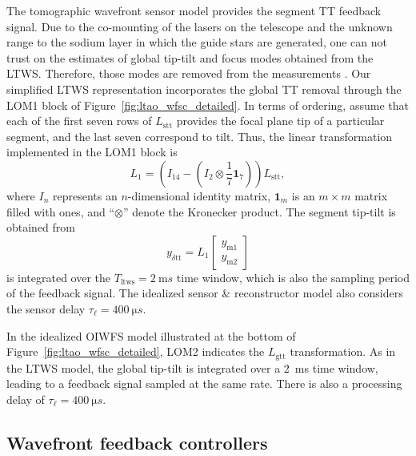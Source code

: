 \documentclass{gmto}
\begin{document}
The tomographic wavefront sensor model provides the segment TT feedback signal. Due to the co-mounting of the lasers on the telescope and the unknown range to the sodium layer in which the guide stars are generated, one can not trust on the estimates of global tip-tilt and focus modes obtained from the LTWS. Therefore, those modes are removed from the measurements \cite{GMT.DOC.05023, FWN.124}. %
Our simplified LTWS representation incorporates the global TT removal through the \textsc{LOM1} block of Figure~\ref{fig:ltao_wfsc_detailed}. In terms of ordering, assume that each of the first seven rows of $L_\text{stt}$ provides the focal plane tip of a particular segment, and the last seven correspond to tilt. Thus, the linear transformation implemented in the \textsc{LOM1} block is
\begin{equation*}
    L_1 = \left(I_{14} - \left(I_2 \otimes \frac{1}{7} \mathbf{1}_{7} \right)\right) L_\text{stt} ,
\end{equation*}
where $I_n$ represents an $n$-dimensional identity matrix, $\mathbf{1}_{m}$ is an $m \times m$ matrix filled with ones, and ``$\otimes$'' denote the Kronecker product. %
%
The segment tip-tilt is obtained from 
\[
y_{\delta\text{tt}} = L_1 \begin{bmatrix}
    y_\text{m1} \\ y_\text{m2}
\end{bmatrix}
\]
is integrated over the $T_\text{ltws}=\SI{2}{\milli s}$ time window, which is also the sampling period of the feedback signal. The idealized sensor \& reconstructor model also considers the sensor delay $\tau_\ell=\SI{400}{\micro s}$.


In the idealized OIWFS model illustrated at the bottom of Figure~\ref{fig:ltao_wfsc_detailed}, \textsc{LOM2} indicates the $L_\text{gtt}$ transformation. As in the LTWS model, the global tip-tilt is integrated over a \SI{2}{\milli s} time window, leading to a feedback signal sampled at the same rate. There is also a processing delay of $\tau_\ell=\SI{400}{\micro s}$.


\subsection{Wavefront feedback controllers}
\end{document}
